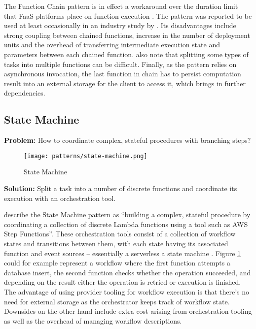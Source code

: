The Function Chain pattern is in effect a workaround over the duration limit that FaaS platforms place on function execution \parencite{leitner18industrialpractice}. The pattern was reported to be used at least occasionally in an industry study by \textcite{leitner18industrialpractice}. Its disadvantages include strong coupling between chained functions, increase in the number of deployment units and the overhead of transferring intermediate execution state and parameters between each chained function. \textcite{leitner18industrialpractice} also note that splitting some types of tasks into multiple functions can be difficult. Finally, as the pattern relies on asynchronous invocation, the last function in chain has to persist computation result into an external storage for the client to access it, which brings in further dependencies.

\subsection{State Machine} \label{subsec:stateMachine}

\textbf{Problem:} How to coordinate complex, stateful procedures with branching steps?

\begin{figure}[h]
  \centering
  \texttt{[image: patterns/state-machine.png]}
  \caption{State Machine}
  \label{fig:patternStateMachine}
\end{figure}

\textbf{Solution:} Split a task into a number of discrete functions and coordinate its execution with an orchestration tool.

\textcite{hong18securingviaserverlesspatterns} describe the State Machine pattern as ``building a complex, stateful procedure by coordinating a collection of discrete Lambda functions using a tool such as AWS Step Functions''. These orchestration tools consist of a collection of workflow states and transitions between them, with each state having its associated function and event sources -- essentially a serverless a state machine \parencite{cncf18serverlessWG}. Figure \ref{fig:patternStateMachine} could for example represent a workflow where the first function attempts a database insert, the second function checks whether the operation succeeded, and depending on the result either the operation is retried or execution is finished. The advantage of using provider tooling for workflow execution is that there's no need for external storage as the orchestrator keeps track of workflow state. Downsides on the other hand include extra cost arising from orchestration tooling as well as the overhead of managing workflow descriptions.

